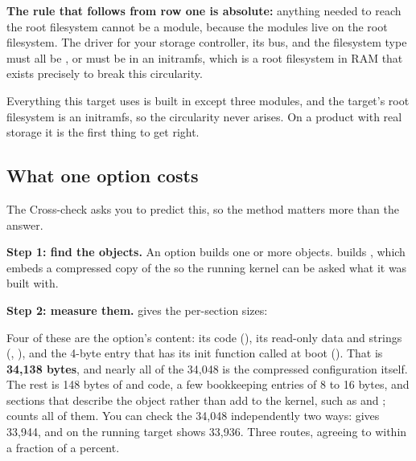 \noindent \textbf{The rule that follows from row one is absolute:} anything needed to reach the root
filesystem cannot be a module, because the modules live on the root filesystem. The driver for your
storage controller, its bus, and the filesystem type must all be , or must be in an
initramfs, which is a root filesystem in RAM that exists precisely to break this circularity.

Everything this target uses is built in except three modules, and the target's root filesystem is
an initramfs, so the circularity never arises. On a product with real storage it is the first thing to
get right.

\subsection{What one option costs}
\label{c3:app:b6}

The Cross-check asks you to predict this, so the method matters more than the answer.

\textbf{Step 1: find the objects.} An option builds one or more objects. 
builds , which embeds a compressed copy of the  so the running
kernel can be asked what it was built with.

\textbf{Step 2: measure them.}  gives the per-section sizes:


\noindent Four of these are the option's content: its code (), its read-only data and
strings (, ), and the 4-byte entry that has its init function
called at boot (). That is \textbf{34,138 bytes}, and nearly all of the 34,048
is the compressed configuration itself. The rest is 148 bytes of  and 
code, a few bookkeeping entries of 8 to 16 bytes, and sections that describe the object rather than
add to the kernel, such as  and ;  counts all of them. You
can check the 34,048 independently two ways: 
gives 33,944, and on the running target  shows 33,936. Three routes,
agreeing to within a fraction of a percent.

